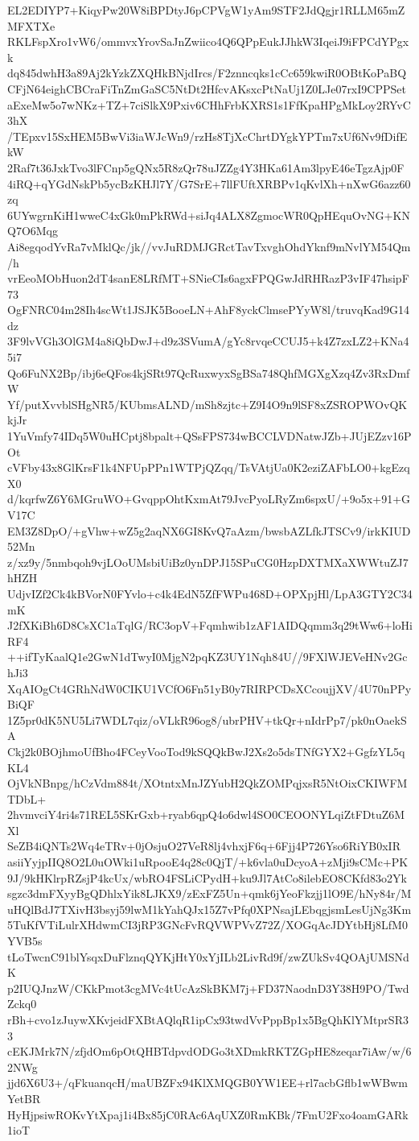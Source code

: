 EL2EDIYP7+KiqyPw20W8iBPDtyJ6pCPVgW1yAm9STF2JdQgjr1RLLM65mZMFXTXe
RKLFspXro1vW6/ommvxYrovSaJnZwiico4Q6QPpEukJJhkW3IqeiJ9iFPCdYPgxk
dq845dwhH3a89Aj2kYzkZXQHkBNjdIrcs/F2znncqks1cCc659kwiR0OBtKoPaBQ
CFjN64eighCBCraFiTnZmGaSC5NtDt2HfcvAKsxcPtNaUj1Z0LJe07rxI9CPPSet
aExeMw5o7wNKz+TZ+7ciSlkX9Pxiv6CHhFrbKXRS1s1FfKpaHPgMkLoy2RYvC3hX
/TEpxv15SxHEM5BwVi3iaWJcWn9/rzHs8TjXcChrtDYgkYPTm7xUf6Nv9fDifEkW
2Raf7t36JxkTvo3lFCnp5gQNx5R8zQr78uJZZg4Y3HKa61Am3lpyE46eTgzAjp0F
4iRQ+qYGdNskPb5ycBzKHJl7Y/G7SrE+7llFUftXRBPv1qKvlXh+nXwG6azz60zq
6UYwgrnKiH1wweC4xGk0mPkRWd+siJq4ALX8ZgmocWR0QpHEquOvNG+KNQ7O6Mqg
Ai8egqodYvRa7vMklQc/jk//vvJuRDMJGRctTavTxvghOhdYknf9mNvlYM54Qm/h
vrEeoMObHuon2dT4sanE8LRfMT+SNieCIs6agxFPQGwJdRHRazP3vIF47hsipF73
OgFNRC04m28Ih4scWt1JSJK5BooeLN+AhF8yckClmsePYyW8l/truvqKad9G14dz
3F9lvVGh3OlGM4a8iQbDwJ+d9z3SVumA/gYc8rvqeCCUJ5+k4Z7zxLZ2+KNa45i7
Qo6FuNX2Bp/ibj6eQFos4kjSRt97QcRuxwyxSgBSa748QhfMGXgXzq4Zv3RxDmfW
Yf/putXvvblSHgNR5/KUbmsALND/mSh8zjtc+Z9I4O9n9lSF8xZSROPWOvQKkjJr
1YuVmfy74IDq5W0uHCptj8bpalt+QSsFPS734wBCCLVDNatwJZb+JUjEZzv16POt
cVFby43x8GlKrsF1k4NFUpPPn1WTPjQZqq/TsVAtjUa0K2eziZAFbLO0+kgEzqX0
d/kqrfwZ6Y6MGruWO+GvqppOhtKxmAt79JvcPyoLRyZm6spxU/+9o5x+91+GV17C
EM3Z8DpO/+gVhw+wZ5g2aqNX6GI8KvQ7aAzm/bwsbAZLfkJTSCv9/irkKIUD52Mn
z/xz9y/5nmbqoh9vjLOoUMsbiUiBz0ynDPJ15SPuCG0HzpDXTMXaXWWtuZJ7hHZH
UdjvIZf2Ck4kBVorN0FYvlo+c4k4EdN5ZfFWPu468D+OPXpjHl/LpA3GTY2C34mK
J2fXKiBh6D8CsXC1aTqlG/RC3opV+Fqmhwib1zAF1AIDQqmm3q29tWw6+loHiRF4
++ifTyKaalQ1e2GwN1dTwyI0MjgN2pqKZ3UY1Nqh84U//9FXlWJEVeHNv2GchJi3
XqAIOgCt4GRhNdW0CIKU1VCfO6Fn51yB0y7RIRPCDsXCcoujjXV/4U70nPPyBiQF
1Z5pr0dK5NU5Li7WDL7qiz/oVLkR96og8/ubrPHV+tkQr+nIdrPp7/pk0nOaekSA
Ckj2k0BOjhmoUfBho4FCeyVooTod9kSQQkBwJ2Xs2o5dsTNfGYX2+GgfzYL5qKL4
OjVkNBnpg/hCzVdm884t/XOtntxMnJZYubH2QkZOMPqjxsR5NtOixCKIWFMTDbL+
2hvmvciY4ri4s71REL5SKrGxb+ryab6qpQ4o6dwl4SO0CEOONYLqiZtFDtuZ6MXl
SeZB4iQNTs2Wq4eTRv+0jOsjuO27VeR8lj4vhxjF6q+6Fjj4P726Yso6RiYB0xIR
asiiYyjpIIQ8O2L0uOWki1uRpooE4q28c0QjT/+k6vla0uDcyoA+zMji9sCMc+PK
9J/9kHKlrpRZsjP4kcUx/wbRO4FSLiCPydH+ku9Jl7AtCo8ilebEO8CKfd83o2Yk
sgzc3dmFXyyBgQDhlxYik8LJKX9/zExFZ5Un+qmk6jYeoFkzjj1lO9E/hNy84r/M
uHQlBdJ7TXivH3bsyj59lwM1kYahQJx15Z7vPfq0XPNsajLEbqgjsmLesUjNg3Km
5TuKfVTiLulrXHdwmCI3jRP3GNcFvRQVWPVvZ72Z/XOGqAcJDYtbHj8LfM0YVB5s
tLoTwcnC91blYsqxDuFlznqQYKjHtY0xYjILb2LivRd9f/zwZUkSv4QOAjUMSNdK
p2IUQJnzW/CKkPmot3cgMVc4tUcAzSkBKM7j+FD37NaodnD3Y38H9PO/TwdZckq0
rBh+cvo1zJuywXKvjeidFXBtAQlqR1ipCx93twdVvPppBp1x5BgQhKlYMtprSR33
cEKJMrk7N/zfjdOm6pOtQHBTdpvdODGo3tXDmkRKTZGpHE8zeqar7iAw/w/62NWg
jjd6X6U3+/qFkuanqcH/maUBZFx94KlXMQGB0YW1EE+rl7acbGflb1wWBwmYetBR
HyHjpsiwROKvYtXpaj1i4Bx85jC0RAc6AqUXZ0RmKBk/7FmU2Fxo4oamGARk1ioT
